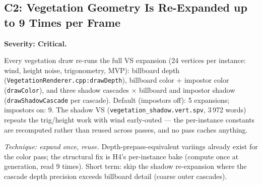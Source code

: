 \documentclass[11pt,a4paper]{article}
\begin{document}
\subsection{C2: Vegetation Geometry Is Re-Expanded up to 9 Times per Frame}
\label{sec:c2}

\textbf{Severity: Critical.}

Every vegetation draw re-runs the full VS expansion (24 vertices per
instance: wind, height noise, trigonometry, MVP): billboard depth
(\texttt{VegetationRenderer.cpp:drawDepth}), billboard color + impostor
color (\texttt{drawColor}), and three shadow cascades $\times$ billboard and
impostor shadow (\texttt{drawShadowCascade} per cascade). Default
(impostors off): 5 expansions; impostors on: 9. The shadow VS
(\texttt{vegetation\_shadow.vert.spv}, 3\,972 words) repeats the trig/height
work with wind early-outed --- the per-instance constants are recomputed
rather than reused across passes, and no pass caches anything.

\textit{Technique: expand once, reuse.} Depth-prepass-equivalent variings
already exist for the color pass; the structural fix is H4's per-instance
bake (compute once at generation, read 9 times). Short term: skip the shadow
re-expansion where the cascade depth precision exceeds billboard detail
(coarse outer cascades).
\end{document}
